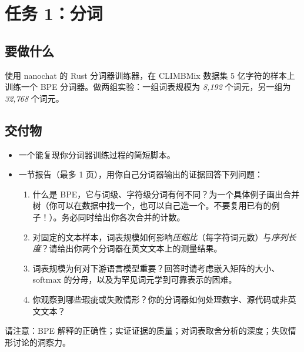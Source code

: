 \section{任务 1：分词}
\label{sec:task1}

\subsection{要做什么}

使用 nanochat 的 Rust 分词器训练器，在 CLIMBMix 数据集 5 亿字符的样本上训练一个 BPE 分词器。做两组实验：一组词表规模为 \textit{8{,}192} 个词元，另一组为 \textit{32{,}768} 个词元。

\subsection{交付物}

\begin{itemize}
    \item 一个能复现你分词器训练过程的简短脚本。
    \item 一节报告（最多 1 页），用你自己分词器输出的证据回答下列问题：
          \begin{enumerate}
              \item 什么是 BPE，它与词级、字符级分词有何不同？为一个具体例子画出合并树（你可以在数据中找一个，也可以自己造一个。不要复用已有的例子！）。务必同时给出你各次合并的计数。
              \item 对固定的文本样本，词表规模如何影响\emph{压缩比}（每字符词元数）与\emph{序列长度}？请给出你两个分词器在英文文本上的测量结果。
              \item 词表规模为何对下游语言模型重要？回答时请考虑嵌入矩阵的大小、softmax 的分母，以及为罕见词元学到可靠表示的困难。
              \item 你观察到哪些瑕疵或失败情形？你的分词器如何处理数字、源代码或非英文文本？
          \end{enumerate}
\end{itemize}
%
请注意：BPE 解释的正确性；实证证据的质量；对词表取舍分析的深度；失败情形讨论的洞察力。




